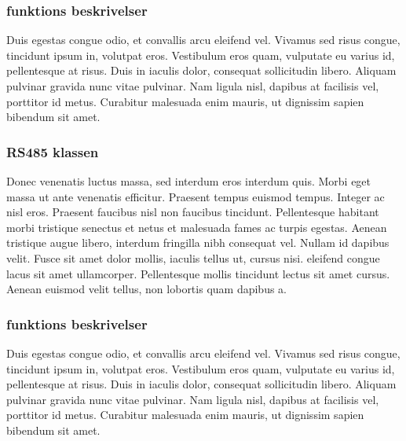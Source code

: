 
\subsubsection{funktions beskrivelser}
Duis egestas congue odio, et convallis arcu eleifend vel. Vivamus sed risus congue, tincidunt ipsum in, volutpat eros. Vestibulum eros quam, vulputate eu varius id, pellentesque at risus. Duis in iaculis dolor, consequat sollicitudin libero. Aliquam pulvinar gravida nunc vitae pulvinar. Nam ligula nisl, dapibus at facilisis vel, porttitor id metus. Curabitur malesuada enim mauris, ut dignissim sapien bibendum sit amet.

\subsubsection{RS485 klassen}
Donec venenatis luctus massa, sed interdum eros interdum quis. Morbi eget massa ut ante venenatis efficitur. Praesent tempus euismod tempus. Integer ac nisl eros. Praesent faucibus nisl non faucibus tincidunt. Pellentesque habitant morbi tristique senectus et netus et malesuada fames ac turpis egestas. Aenean tristique augue libero, interdum fringilla nibh consequat vel. Nullam id dapibus velit. Fusce sit amet dolor mollis, iaculis tellus ut, cursus nisi.  eleifend congue lacus sit amet ullamcorper. Pellentesque mollis tincidunt lectus sit amet cursus. Aenean euismod velit tellus, non lobortis quam dapibus a.


\subsubsection{funktions beskrivelser}
Duis egestas congue odio, et convallis arcu eleifend vel. Vivamus sed risus congue, tincidunt ipsum in, volutpat eros. Vestibulum eros quam, vulputate eu varius id, pellentesque at risus. Duis in iaculis dolor, consequat sollicitudin libero. Aliquam pulvinar gravida nunc vitae pulvinar. Nam ligula nisl, dapibus at facilisis vel, porttitor id metus. Curabitur malesuada enim mauris, ut dignissim sapien bibendum sit amet.